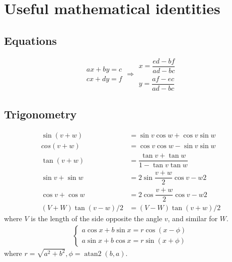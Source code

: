 
\chapter{Useful mathematical identities}

\section{Equations}
$$\begin{aligned}ax+by=c\\cx+dy=f\end{aligned}
\Rightarrow
\begin{aligned}x=\dfrac{ed-bf}{ad-bc}\\y=\dfrac{af-ec}{ad-bc}\end{aligned}$$
\section{Trigonometry}
\begin{align*}
\sin(v+w)&{}=\sin v\cos w+\cos v\sin w\\
cos(v+w)&{}=\cos v\cos w-\sin v\sin w\\
\tan(v+w)&{}=\dfrac{\tan v+\tan w}{1-\tan v\tan w}\\
\sin v+\sin w&{}=2\sin\dfrac{v+w}{2}\cos{v-w}{2}\\
\cos v+\cos w&{}=2\cos\dfrac{v+w}{2}\cos{v-w}{2}\\
(V+W)\tan(v-w)/2&{}=(V-W)\tan(v+w)/2
\end{align*}
where $V$ is the length of the side opposite the angle $v$, and
similar for $W$.
\begin{align*}
\begin{cases}
a\cos x+b\sin x=r\cos(x-\phi)\\
a\sin x+b\cos x=r\sin(x+\phi)
\end{cases}
\end{align*}
where $r=\sqrt{a^2+b^2}, \phi=\operatorname{atan2}(b,a)$.
